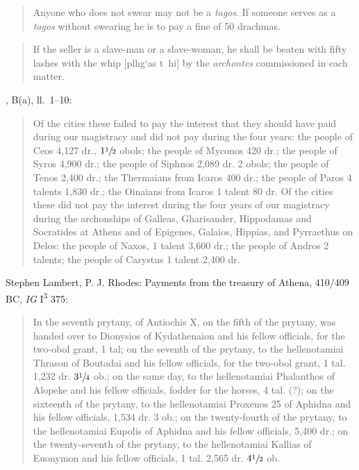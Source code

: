 \documentclass{article}
\newcommand{\Gk}[1]{\selectlanguage{polutonikogreek}#1\selectlanguage{english}}
\theoremstyle{definition}
\begin{document}
\begin{quote}
Anyone who does not swear may not be a {\em tagos}. If someone serves as a {\em tagos} without swearing he is to pay a fine of 50 drachmas.
\end{quote}

\begin{quote}
If the seller is a slave-man or a slave-woman, he shall be beaten with fifty lashes with the whip [\Gk{plhg`as t~hi}] by the {\em archontes} commissioned in each matter.
\end{quote}

\cite[p.~141]{rhodes}, B(a), ll.~1--10:

\begin{quote}
Of the cities these failed to pay the interest that they should have paid during our magistracy and did not pay during the four years:
the people of Ceos 4,127 dr., $1 \sfrac{1}{2}$ obols; the people of Myconos
420 dr.; the people of Syros 4,900 dr.; the people of
Siphnos 2,089 dr. 2 obols; the people of Tenos 2,400 dr.; the Thermaians from Icaros 400 dr.;
the people of Paros 4 talents 1,830 dr.; the Oinaians from Icaros 1 talent 80 dr. Of the cities these did not pay the interest during the
four years of our magistracy during the archonships of Galleas, Gharisander, Hippodamas and Socratides at Athens and of Epigenes,
Galaios, Hippias, and Pyrraethus on Delos: the people of Naxos, 1 talent 3,600 dr.; the people of Andros 2 talents; the people of
Carystus 1 talent 2,400 dr.
\end{quote}

Stephen Lambert, P. J. Rhodes: Payments from the treasury of Athena, 410/409 BC, {\em IG} I\textsuperscript{3} 375:

\begin{quote}
In the seventh prytany, of Antiochis X, on the fifth of the prytany, was handed over to Dionysios of Kydathenaion and his fellow officials, for the two-obol grant, 1 tal; on the seventh
of the prytany, to the hellenotamiai Thrason of Boutadai and his fellow officials, for the two-obol grant, 1 tal. 1,232 dr. $3 \sfrac{1}{4}$ ob.; on the same day, to the hellenotamiai
Phalanthos of Alopeke and his fellow officials, fodder for the horses, 4 tal. (?); on the sixteenth of the prytany, to the hellenotamiai Proxenos 25 of Aphidna and his fellow officials,
1,534 dr. 3 ob.; on the twenty-fourth of the prytany, to the hellenotamiai Eupolis of Aphidna and his fellow officials, 5,400 dr.; on the twenty-seventh of the prytany, to the
hellenotamiai Kallias of Euonymon and his fellow officials, 1 tal. 2,565 dr. $4 \sfrac{1}{2}$ ob.
\end{quote}
\end{document}
